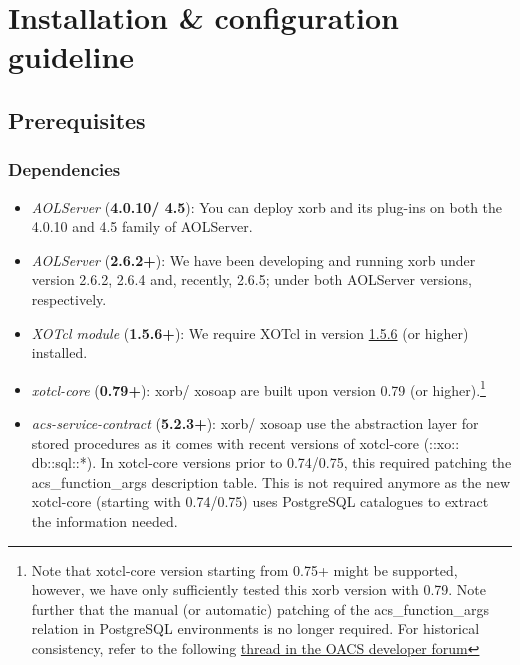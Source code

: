      \section{Installation \& configuration guideline}\label{sec:installation}
     	\subsection{Prerequisites}
	\subsubsection{Dependencies}
	\begin{itemize}
	\item \emph{AOLServer} (\textbf{4.0.10/ 4.5}): You can deploy
          xorb and its plug-ins on both the 4.0.10 and 4.5 family of AOLServer.
	\item \emph{AOLServer} (\textbf{2.6.2+}): We have been
          developing and running xorb under version 2.6.2, 2.6.4 and, recently,
          2.6.5; under both AOLServer versions, respectively.
	\item \emph{XOTcl module} (\textbf{1.5.6+}): We require XOTcl
          in version
          \href{http://media.wu-wien.ac.at/download/xotcl-1.5.6.tar.gz}{1.5.6}
          (or higher) installed.
	\item \emph{xotcl-core} (\textbf{0.79+}): xorb/ xosoap are
          built upon version 0.79 (or higher).\footnote{
            Note that xotcl-core version starting from 0.75+ might be
            supported, however, we have only sufficiently tested this
            xorb version with 0.79. Note further that the manual (or
            automatic) patching of the acs\_function\_args relation in
            PostgreSQL environments is no longer required. For
            historical consistency, refer to the following
            \href{http://openacs.org/forums/message-view?message_id=1165990}{thread
              in the OACS developer forum}
          }
	\item \emph{acs-service-contract} (\textbf{5.2.3+}): xorb/
          xosoap use the abstraction layer for stored procedures as it comes
          with recent versions of xotcl-core (::xo:: db::sql::*). In
          xotcl-core versions prior to 0.74/0.75, this required
          patching the acs\_function\_args description table. This is
          not required anymore as the new xotcl-core (starting with
          0.74/0.75) uses PostgreSQL catalogues to extract the
          information needed.
	\end{itemize}
